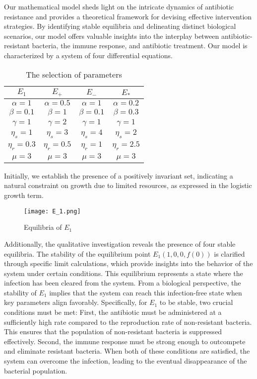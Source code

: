 Our mathematical model sheds light on the intricate dynamics of antibiotic resistance and provides a theoretical framework for devising effective intervention strategies. By identifying stable equilibria and delineating distinct biological scenarios, our model offers valuable insights into the interplay between antibiotic-resistant bacteria, the immune response, and antibiotic treatment. Our model is characterized by a system of four differential equations.

\begin{table}[ht]
	\centering
	\caption{The selection of parameters}
	\label{tab:parameters}
	\begin{tabular}{cccc}
		\hline
		\textbf{$E_1$} & \textbf{$E_+$} & \textbf{$E_-$} & \textbf{$E_*$} \\ 
		\hline
		$\alpha = 1$ & $\alpha = 0.5$ & $\alpha = 1$ & $\alpha = 0.2$ \\
		$\beta = 0.1$ & $\beta = 1$ & $\beta = 0.1$ & $\beta = 0.3$ \\
		$\gamma = 1$ & $\gamma = 2$ & $\gamma = 1$ & $\gamma = 1$ \\
		$\eta_s = 1$ & $\eta_s = 3$ & $\eta_s = 4$ & $\eta_s = 2$ \\
		$\eta_r = 0.3$ & $\eta_r = 0.5$ & $\eta_r = 1$ & $\eta_r = 2.5$ \\
		$\mu = 3$ & $\mu = 3$ & $\mu = 3$ & $\mu = 3$ \\
		\hline
	\end{tabular}
\end{table}


Initially, we establish the presence of a positively invariant set, indicating a natural constraint on growth due to limited resources, as expressed in the logistic growth term.

\begin{figure}
	\centering
	\caption{Equilibria of $E_1$}
	\label{fig:e1}
	\texttt{[image: E\_1.png]}
\end{figure}


Additionally, the qualitative investigation reveals the presence of four stable equilibria. The stability of the equilibrium point $E_1 \left(1, 0, 0, f(0)\right)$ is clarified through specific limit calculations, which provide insights into the behavior of the system under certain conditions. This equilibrium represents a state where the infection has been cleared from the system. From a biological perspective, the stability of $E_1$ implies that the system can reach this infection-free state when key parameters align favorably. Specifically, for $E_1$ to be stable, two crucial conditions must be met: First, the antibiotic must be administered at a sufficiently high rate compared to the reproduction rate of non-resistant bacteria. This ensures that the population of non-resistant bacteria is suppressed effectively. Second, the immune response must be strong enough to outcompete and eliminate resistant bacteria. When both of these conditions are satisfied, the system can overcome the infection, leading to the eventual disappearance of the bacterial population.


